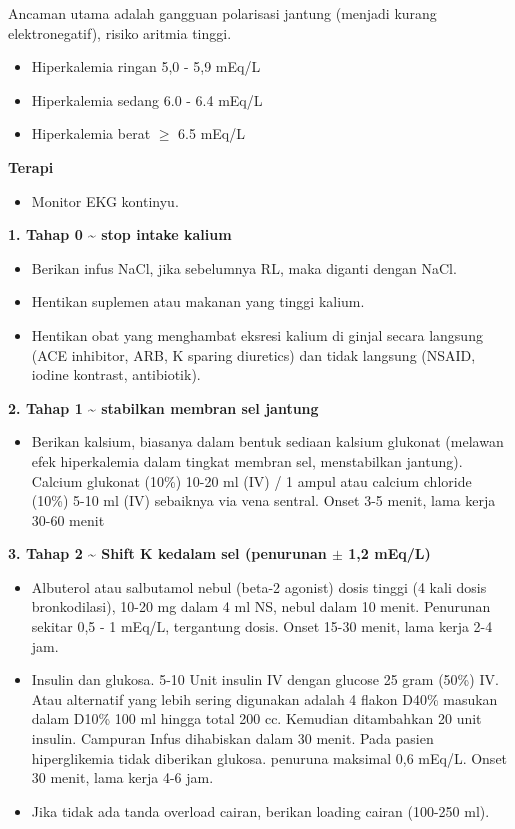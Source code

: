 \documentclass[
]{book}
\providecommand{\tightlist}{%
  \setlength{\itemsep}{0pt}\setlength{\parskip}{0pt}}
\begin{document}
Ancaman utama adalah gangguan polarisasi jantung (menjadi kurang elektronegatif), risiko aritmia tinggi.

\begin{itemize}
\tightlist
\item
  Hiperkalemia ringan 5,0 - 5,9 mEq/L
\item
  Hiperkalemia sedang 6.0 - 6.4 mEq/L
\item
  Hiperkalemia berat \(\geq\) 6.5 mEq/L
\end{itemize}

\textbf{Terapi}

\begin{itemize}
\tightlist
\item
  Monitor EKG kontinyu.
\end{itemize}

\textbf{1. Tahap 0 \textasciitilde{} stop intake kalium}

\begin{itemize}
\tightlist
\item
  Berikan infus NaCl, jika sebelumnya RL, maka diganti dengan NaCl.
\item
  Hentikan suplemen atau makanan yang tinggi kalium.
\item
  Hentikan obat yang menghambat eksresi kalium di ginjal secara langsung (ACE inhibitor, ARB, K sparing diuretics) dan tidak langsung (NSAID, iodine kontrast, antibiotik).
\end{itemize}

\textbf{2. Tahap 1 \textasciitilde{} stabilkan membran sel jantung}

\begin{itemize}
\tightlist
\item
  Berikan kalsium, biasanya dalam bentuk sediaan kalsium glukonat (melawan efek hiperkalemia dalam tingkat membran sel, menstabilkan jantung). Calcium glukonat (10\%) 10-20 ml (IV) / 1 ampul atau calcium chloride (10\%) 5-10 ml (IV) sebaiknya via vena sentral. Onset 3-5 menit, lama kerja 30-60 menit
\end{itemize}

\textbf{3. Tahap 2 \textasciitilde{} Shift K kedalam sel (penurunan \(\pm\) 1,2 mEq/L)}

\begin{itemize}
\tightlist
\item
  Albuterol atau salbutamol nebul (beta-2 agonist) dosis tinggi (4 kali dosis bronkodilasi), 10-20 mg dalam 4 ml NS, nebul dalam 10 menit. Penurunan sekitar 0,5 - 1 mEq/L, tergantung dosis. Onset 15-30 menit, lama kerja 2-4 jam.
\item
  Insulin dan glukosa. 5-10 Unit insulin IV dengan glucose 25 gram (50\%) IV. Atau alternatif yang lebih sering digunakan adalah 4 flakon D40\% masukan dalam D10\% 100 ml hingga total 200 cc. Kemudian ditambahkan 20 unit insulin. Campuran Infus dihabiskan dalam 30 menit. Pada pasien hiperglikemia tidak diberikan glukosa. penuruna maksimal 0,6 mEq/L. Onset 30 menit, lama kerja 4-6 jam.
\item
  Jika tidak ada tanda overload cairan, berikan loading cairan (100-250 ml).
\end{itemize}
\end{document}
